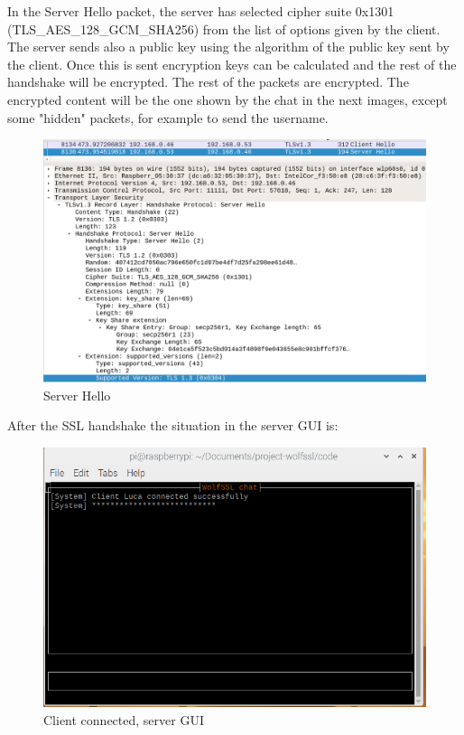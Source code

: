 \documentclass[a4paper,12pt]{report}
\begin{document}
In the Server Hello packet, the server has selected cipher suite 0x1301 (TLS\_AES\_128\_GCM\_SHA256) from the list of options given by the client.
\\The server sends also a public key using the algorithm of the public key sent by the client. Once this is sent encryption keys can be calculated and the rest of the handshake will be encrypted.
The rest of the packets are encrypted. The encrypted content will be the one shown by the chat in the next images, except some "hidden" packets, for example to send the username.

\begin{figure}[H]
    \centering
    \includegraphics[scale=0.248]{./code/img/server-hello.png}
    \caption{Server Hello}
    \label{fig:galaxy}
\end{figure}
\pagebreak

After the SSL handshake the situation in the server GUI is:
\begin{figure}[H]
    \centering
    \includegraphics[scale=0.6]{./code/img/2-server.png}
    \caption{Client connected, server GUI}
    \label{fig:galaxy}
\end{figure}
\end{document}
